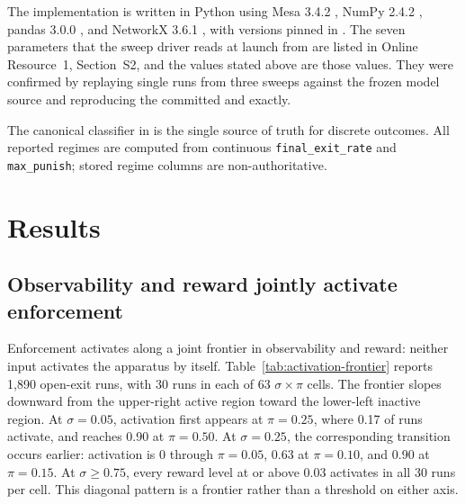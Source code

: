 \documentclass[12pt]{article}
\begin{document}
The implementation is written in Python using Mesa 3.4.2 \citep{mesa2020}, NumPy
2.4.2 \citep{numpy2020}, pandas 3.0.0 \citep{pandas2010}, and NetworkX 3.6.1
\citep{networkx2008}, with versions pinned in . The seven
parameters that the sweep driver reads at launch from
 are listed in Online Resource~1,
Section~S2, and the values stated above are those values. They were confirmed by
replaying single runs from three sweeps against the frozen model source and
reproducing the committed  and 
exactly.

The canonical classifier in  is the single source
of truth for discrete outcomes. All reported regimes are computed from
continuous \texttt{final\_exit\_rate} and \texttt{max\_punish}; stored regime
columns are non-authoritative.


\section{Results}

\subsection{Observability and reward jointly activate enforcement}

Enforcement activates along a joint frontier in observability and reward: neither input
activates the apparatus by itself. Table~\ref{tab:activation-frontier} reports 1,890 open-exit
runs, with 30 runs in each of 63 \(\sigma \times \pi\) cells. The frontier slopes downward from
the upper-right active region toward the lower-left inactive region. At \(\sigma=0.05\),
activation first appears at \(\pi=0.25\), where 0.17 of runs activate, and reaches 0.90 at
\(\pi=0.50\). At \(\sigma=0.25\), the corresponding transition occurs earlier: activation is 0
through \(\pi=0.05\), 0.63 at \(\pi=0.10\), and 0.90 at \(\pi=0.15\). At \(\sigma \geq 0.75\),
every reward level at or above 0.03 activates in all 30 runs per cell. This diagonal pattern is
a frontier rather than a threshold on either axis.
\end{document}
